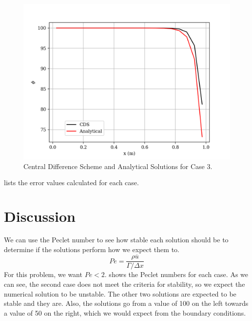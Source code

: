\documentclass[12pt]{article}
\begin{document}
    
    \begin{figure}[htbp]
        \centering
        \includegraphics[width=\textwidth]{plots/graph_case3.png}
        \caption{Central Difference Scheme and Analytical Solutions for Case 3.}
        \label{fig:case3}
    \end{figure}

    \clearpage
     lists the error values calculated for each case.
    

    

\section{Discussion}
We can use the Peclet number to see how stable each solution should be to determine if the solutions perform how we expect them to.
\begin{equation}
    Pe = \frac{\rho \overline{u}}{\Gamma / \Delta x}
\end{equation}
For this problem, we want $Pe<2$.  shows the Peclet numbers for each case. As we can see, the second case does not meet the criteria for stability, so we expect the numerical solution to be unstable. The other two solutions are expected to be stable and they are. Also, the solutions go from a value of 100 on the left towards a value of 50 on the right, which we would expect from the boundary conditions.

\end{document}
